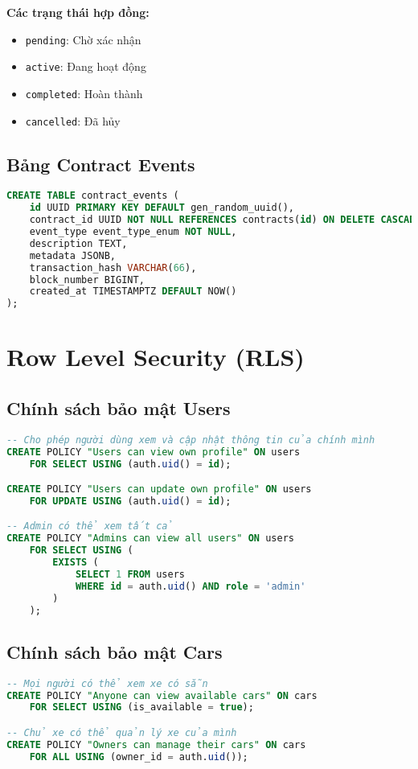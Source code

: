 \documentclass[12pt,a4paper]{article}
\begin{document}
\textbf{Các trạng thái hợp đồng:}
\begin{itemize}
    \item \texttt{pending}: Chờ xác nhận
    \item \texttt{active}: Đang hoạt động
    \item \texttt{completed}: Hoàn thành
    \item \texttt{cancelled}: Đã hủy
\end{itemize}

\subsection{Bảng Contract Events}
\begin{lstlisting}[language=SQL, caption=Cấu trúc bảng contract_events]
CREATE TABLE contract_events (
    id UUID PRIMARY KEY DEFAULT gen_random_uuid(),
    contract_id UUID NOT NULL REFERENCES contracts(id) ON DELETE CASCADE,
    event_type event_type_enum NOT NULL,
    description TEXT,
    metadata JSONB,
    transaction_hash VARCHAR(66),
    block_number BIGINT,
    created_at TIMESTAMPTZ DEFAULT NOW()
);
\end{lstlisting}

\section{Row Level Security (RLS)}

\subsection{Chính sách bảo mật Users}
\begin{lstlisting}[language=SQL, caption=RLS cho bảng users]
-- Cho phép người dùng xem và cập nhật thông tin của chính mình
CREATE POLICY "Users can view own profile" ON users
    FOR SELECT USING (auth.uid() = id);

CREATE POLICY "Users can update own profile" ON users
    FOR UPDATE USING (auth.uid() = id);

-- Admin có thể xem tất cả
CREATE POLICY "Admins can view all users" ON users
    FOR SELECT USING (
        EXISTS (
            SELECT 1 FROM users 
            WHERE id = auth.uid() AND role = 'admin'
        )
    );
\end{lstlisting}

\subsection{Chính sách bảo mật Cars}
\begin{lstlisting}[language=SQL, caption=RLS cho bảng cars]
-- Mọi người có thể xem xe có sẵn
CREATE POLICY "Anyone can view available cars" ON cars
    FOR SELECT USING (is_available = true);

-- Chủ xe có thể quản lý xe của mình
CREATE POLICY "Owners can manage their cars" ON cars
    FOR ALL USING (owner_id = auth.uid());
\end{lstlisting}
\end{document}
